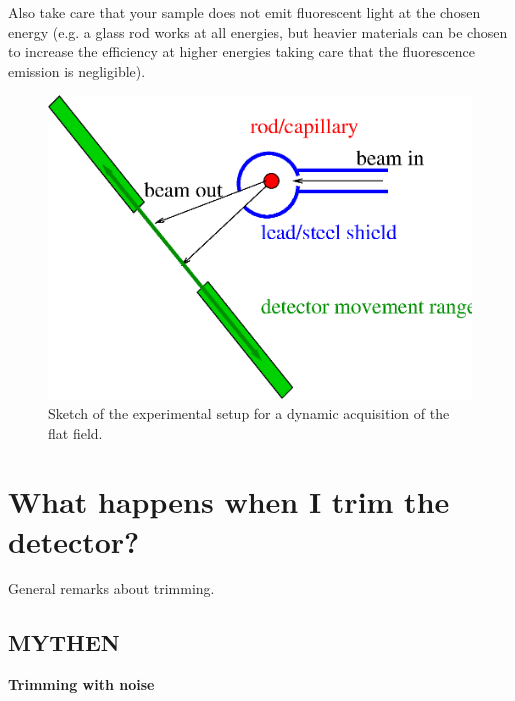 Also take care that your sample does not emit fluorescent light at the chosen energy (e.g. a glass rod works at all energies, but heavier materials can be chosen to increase the efficiency at higher energies taking care that the fluorescence emission is negligible).

\begin{figure}
\begin{center}
\includegraphics[width=\textwidth]{images/FFSetup}
\end{center}
\caption{Sketch of the experimental setup for a dynamic acquisition of the flat field.}\label{fig:ffsetup}
\end{figure}

\section{What happens when I trim the detector?}

General remarks about trimming.

\subsection{MYTHEN}

\textbf{Trimming with noise} \label{sec:noisetrim}\\

